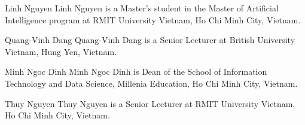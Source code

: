 \documentclass{ieeeaccess}
\begin{document}



\begin{IEEEbiographynophoto}{Linh Nguyen}
Linh Nguyen is a Master's student in the Master of Artificial Intelligence program at RMIT University Vietnam, Ho Chi Minh City, Vietnam.
\end{IEEEbiographynophoto}

\begin{IEEEbiographynophoto}{Quang-Vinh Dang}
Quang-Vinh Dang is a Senior Lecturer at British University Vietnam, Hung Yen, Vietnam.
\end{IEEEbiographynophoto}

\begin{IEEEbiographynophoto}{Minh Ngoc Dinh}
Minh Ngoc Dinh is Dean of the School of Information Technology and Data Science, Millenia Education, Ho Chi Minh City, Vietnam.
\end{IEEEbiographynophoto}

\begin{IEEEbiographynophoto}{Thuy Nguyen}
Thuy Nguyen is a Senior Lecturer at RMIT University Vietnam, Ho Chi Minh City, Vietnam.
\end{IEEEbiographynophoto}


\EOD
\end{document}
